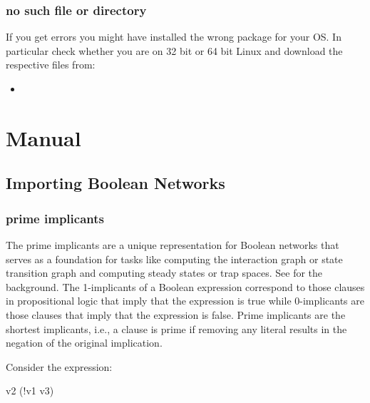 \documentclass[letterpaper,10pt,english]{sphinxmanual}
\begin{document}
\subsection{no such file or directory}
\label{\detokenize{Installation:no-such-file-or-directory}}
If you get  errors you might have installed the wrong package for your OS. In particular check whether you are on 32 bit or 64 bit Linux and download the respective files from:
\begin{itemize}
\item {} 

\end{itemize}


\chapter{Manual}
\label{\detokenize{Manual:manual}}\label{\detokenize{Manual:networkx-has-path}}\label{\detokenize{Manual::doc}}

\section{Importing Boolean Networks}
\label{\detokenize{Manual:importing-boolean-networks}}

\subsection{prime implicants}
\label{\detokenize{Manual:prime-implicants}}
The prime implicants are a unique representation for Boolean networks that serves as a foundation for tasks
like computing the interaction graph or state transition graph and computing steady states or trap spaces.
See {\hyperref[\detokenize{Bibliography:klarner2015trap}]{}} for the background.
The 1-implicants of a Boolean expression correspond to those clauses in propositional logic
that imply that the expression is true while 0-implicants are those clauses that imply that the expression is false.
Prime implicants are the shortest implicants, i.e.,
a clause is prime if removing any literal results in the negation of the original implication.

Consider the expression:

\begin{sphinxVerbatim}[commandchars=\\\{\}]
v2 \PYGZam{} (!v1 \textbar{} v3)
\end{sphinxVerbatim}
\end{document}
